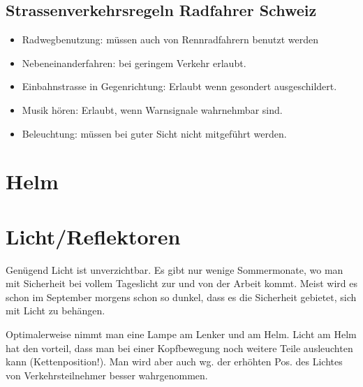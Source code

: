 \subsection{Strassenverkehrsregeln Radfahrer Schweiz}
\begin{itemize}
        \item Radwegbenutzung: müssen auch von Rennradfahrern benutzt werden
        \item Nebeneinanderfahren: bei geringem Verkehr erlaubt.
        \item Einbahnstrasse in Gegenrichtung: Erlaubt wenn gesondert ausgeschildert.
        \item Musik hören: Erlaubt, wenn Warnsignale wahrnehmbar sind.
        \item Beleuchtung: müssen bei guter Sicht nicht mitgeführt werden.
\end{itemize}

\section{Helm}

\section{Licht/Reflektoren}

Genügend Licht ist unverzichtbar. Es gibt nur wenige Sommermonate, wo man mit Sicherheit bei vollem Tageslicht zur und von der Arbeit kommt.
Meist wird es schon im September morgens schon so dunkel, dass es die Sicherheit gebietet, sich mit Licht zu behängen.

Optimalerweise nimmt man eine Lampe am Lenker und am Helm. Licht am Helm hat den vorteil, dass man bei einer Kopfbewegung
noch weitere Teile ausleuchten kann (Kettenposition!). Man wird aber auch wg. der erhöhten Pos. des Lichtes
von Verkehrsteilnehmer besser wahrgenommen.

